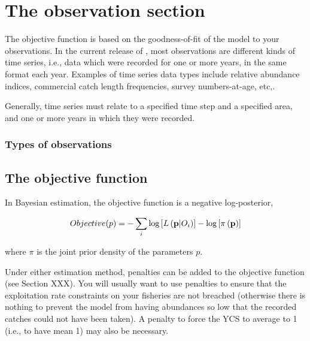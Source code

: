 \section{The observation section\label{sec:observation-section}}

The objective function is based on the goodness-of-fit of the model to your observations. In the current release of \SPM, most observations are different kinds of time series, i.e., data which were recorded for one or more years, in the same format each year. Examples of time series data types include relative abundance indices, commercial catch length frequencies, survey numbers-at-age, etc,. 

Generally, time series must relate to a specified time step and a specified area, and one or more years in which they were recorded.

\subsubsection{Types of observations}

\subsection{The objective function}

In Bayesian estimation, the objective function is a negative log-posterior,

\[
Objective(p)= - \sum\limits_i {\log \left[ {L\left( {{\bf{p}}|O_i } \right)} \right]}  - \log \left[ {\pi \left( {\bf{p}} \right)} \right]
\]

where $\pi$ is the joint prior density of the parameters $p$.

Under either estimation method, penalties can be added to the objective function (see Section XXX). You will usually want to use penalties to ensure that the exploitation rate constraints on your fisheries are not breached (otherwise there is nothing to prevent the model from having abundances so low that the recorded catches could not have been taken). A penalty to force the YCS to average to 1 (i.e., to have mean 1) may also be necessary.
